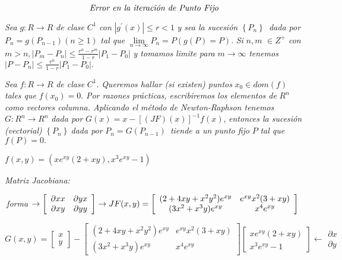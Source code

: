 \documentclass{article}
\begin{document}
\begin{equation*}
\text{\emph{Error en la iteraci\'{o}n de Punto Fijo}}
\end{equation*}

\textit{Sea }$g:R\rightarrow R$ \textit{de clase }$C^{1}$ \textit{con }$%
\left\vert g^{\prime }(x)\right\vert \leq r<1$ \textit{y sea la sucesi\'{o}n 
}$\left\{ P_{n}\right\} $\textit{\ dada por }$P_{n}=g(P_{n-1})(n\geq 1)$ 
\textit{tal que }$\underset{n\rightarrow \infty }{\lim }P_{n}=P(g(P)=P)$. 
\textit{Si }$n,m$ $\in Z^{+}$ \textit{con }$m>n,\left\vert
P_{m}-P_{n}\right\vert \leq \frac{r^{n}-r^{m}}{1-r}\left\vert
P_{1}-P_{0}\right\vert $ \textit{y tomamos limite para }$m\rightarrow \infty 
$ \textit{tenemos }$\left\vert P-P_{n}\right\vert \leq \frac{r^{n}}{1-r}%
\left\vert P_{1}-P_{0}\right\vert .$

\textit{Sea }$f:R\rightarrow R$ \textit{de clase }$C^{1}.$ \textit{Queremos
hallar (si existen) puntos }$x_{0}\in dom(f)$ \textit{tales que }$%
f(x_{0})=0. $ \textit{Por razones pr\'{a}cticas, escribiremos los elementos
de }$R^{n}$ \textit{como vectores columna. Aplicando el m\'{e}todo de
Newton-Raphson tenemos }$G:R^{n}\rightarrow R^{n}$ \textit{dada por }$G(x)=x-%
\left[ (JF)(x)\right] ^{-1}f(x)$, \textit{entonces la sucesi\'{o}n
(vectorial) }$\left\{ P_{n}\right\} \mathit{\ }$\textit{dada por }$%
P_{n}=G(P_{n-1})$\textit{\ tiende a un punto fijo }$P$ \textit{tal que }$%
f(P)=0.$


$f(x,y)=(xe^{xy}(2+xy),x^{3}e^{xy}-1)$

\textit{Matriz Jacobiana:}

$\ $\textit{forma }$\rightarrow \bigskip \left[ 
\begin{array}{cc}
\partial xx & \partial yx \\ 
\partial xy & \partial yy%
\end{array}%
\right] \rightarrow JF(x,y)=\left[ 
\begin{array}{cc}
(2+4xy+x^{2}y^{2})e^{xy} & e^{xy}x^{2}(3+xy) \\ 
(3x^{2}+x^{3}y)e^{xy} & x^{4}e^{xy}%
\end{array}%
\right] $

$G(x,y)=\left[ 
\begin{array}{c}
x \\ 
y%
\end{array}%
\right] -\left[ 
\begin{array}{cc}
(2+4xy+x^{2}y^{2})e^{xy} & e^{xy}x^{2}(3+xy) \\ 
(3x^{2}+x^{3}y)e^{xy} & x^{4}e^{xy}%
\end{array}%
\right] \left[ 
\begin{array}{c}
xe^{xy}(2+xy) \\ 
x^{3}e^{xy}-1%
\end{array}%
\right] \leftarrow 
\begin{array}{c}
\partial x \\ 
\partial y%
\end{array}%
$
\end{document}
